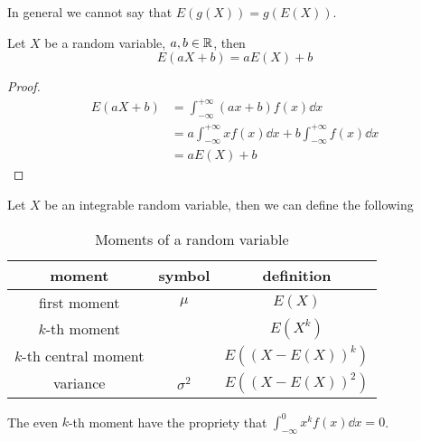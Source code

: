 \documentclass[12pt]{extarticle}
\begin{document}
\begin{remark}
    In general we cannot say that $E(g(X)) = g(E(X))$.
\end{remark}

\begin{theorem}
    Let $X$ be a random variable, $a, b \in \mathbb{R}$, then
    \begin{equation}
        E(aX + b) = aE(X) + b
    \end{equation}
\end{theorem}

\begin{proof}
    \skiplineafterproof
    \begin{align}
        E(aX + b) & = \int_{-\infty}^{+\infty} (ax + b) f(x) \dd{x}                                     \\
                  & = a \int_{-\infty}^{+\infty} x f(x) \dd{x} + b \int_{-\infty}^{+\infty} f(x) \dd{x} \\
                  & = aE(X) + b
    \end{align}
\end{proof}

\begin{definition}[moment]
    Let $X$ be an integrable random variable, then we can define the following

    \begin{table}[H]
        \centering
        \begin{tabular}{|c|c|c|}
            \hline
            \textbf{moment}       & \textbf{symbol} & \textbf{definition} \\
            \hline
            first moment          & $\mu$           & $E(X)$              \\
            $k$-th moment         &                 & $E(X^k)$            \\
            $k$-th central moment &                 & $E((X - E(X))^k)$   \\
            variance              & $\sigma^2$      & $E((X - E(X))^2)$   \\
            \hline
        \end{tabular}

        \caption{Moments of a random variable}
        \label{tab:moments}
    \end{table}

    The even $k$-th moment have the propriety that $\int_{-\infty}^0 x^k f(x) \dd{x} = 0$.
\end{definition}
\end{document}
